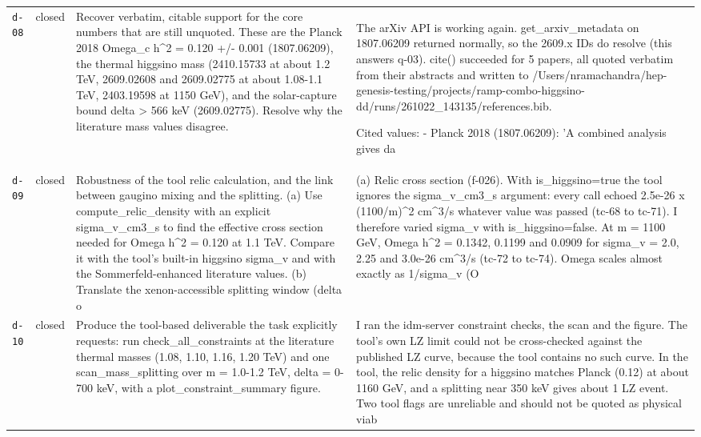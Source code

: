 \documentclass[11pt,a4paper]{article}
\begin{document}
\begin{longtable}{@{}p{}p{}p{}p{}@{}}
\texttt{d-08} & closed & Recover verbatim, citable support for the core numbers that are still unquoted. These are the Planck 2018 Omega\_c h\textasciicircum{}2 = 0.120 +/- 0.001 (1807.06209), the thermal higgsino mass (2410.15733 at about 1.2 TeV, 2609.02608 and 2609.02775 at about 1.08-1.1 TeV, 2403.19598 at 1150 GeV), and the solar-capture bound delta \textgreater{} 566 keV (2609.02775). Resolve why the literature mass values disagree. & The arXiv API is working again. get\_arxiv\_metadata on 1807.06209 returned normally, so the 2609.x IDs do resolve (this answers q-03). cite() succeeded for 5 papers, all quoted verbatim from their abstracts and written to /Users/nramachandra/hep-genesis-testing/projects/ramp-combo-higgsino-dd/runs/261022\_143135/references.bib.

Cited values:
- Planck 2018 (1807.06209): 'A combined analysis gives da \\
\texttt{d-09} & closed & Robustness of the tool relic calculation, and the link between gaugino mixing and the splitting. (a) Use compute\_relic\_density with an explicit sigma\_v\_cm3\_s to find the effective cross section needed for Omega h\textasciicircum{}2 = 0.120 at 1.1 TeV. Compare it with the tool's built-in higgsino sigma\_v and with the Sommerfeld-enhanced literature values. (b) Translate the xenon-accessible splitting window (delta o & (a) Relic cross section (f-026). With is\_higgsino=true the tool ignores the sigma\_v\_cm3\_s argument: every call echoed 2.5e-26 x (1100/m)\textasciicircum{}2 cm\textasciicircum{}3/s whatever value was passed (tc-68 to tc-71). I therefore varied sigma\_v with is\_higgsino=false. At m = 1100 GeV, Omega h\textasciicircum{}2 = 0.1342, 0.1199 and 0.0909 for sigma\_v = 2.0, 2.25 and 3.0e-26 cm\textasciicircum{}3/s (tc-72 to tc-74). Omega scales almost exactly as 1/sigma\_v (O \\
\texttt{d-10} & closed & Produce the tool-based deliverable the task explicitly requests: run check\_all\_constraints at the literature thermal masses (1.08, 1.10, 1.16, 1.20 TeV) and one scan\_mass\_splitting over m = 1.0-1.2 TeV, delta = 0-700 keV, with a plot\_constraint\_summary figure. & I ran the idm-server constraint checks, the scan and the figure. The tool's own LZ limit could not be cross-checked against the published LZ curve, because the tool contains no such curve. In the tool, the relic density for a higgsino matches Planck (0.12) at about 1160 GeV, and a splitting near 350 keV gives about 1 LZ event. Two tool flags are unreliable and should not be quoted as physical viab \\

\end{longtable}
\end{document}
